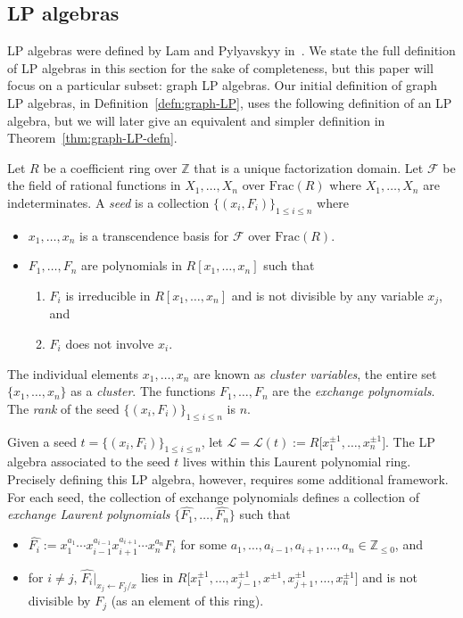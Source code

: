 \documentclass[pdftex]{sigma}
\numberwithin{equation}{section}
\newcommand{\Z}{\mathbb{Z}}
\begin{document}
\subsection{LP algebras}\label{sec:LP}
LP algebras were defined by Lam and Pylyavskyy in~\cite{LP-12}. We state the full definition of LP algebras in this section for the sake of completeness, but this paper will focus on a particular subset: graph LP algebras. Our initial definition of graph LP algebras, in Definition~\ref{defn:graph-LP}, uses the following definition of an LP algebra, but we will later give an equivalent and simpler definition in Theorem~\ref{thm:graph-LP-defn}.
\begin{Definition}[{cf.\ \cite[Section~2.1]{LP-12}}]
\label{defn:LP-alg}
Let $R$ be a coefficient ring over $\Z$ that is a unique factorization domain. Let $\mathcal{F}$ be the field of rational functions in $X_1,\dots,X_n$ over $\text{Frac}(R)$ where $X_1,\dots,X_n$ are indeterminates. A \emph{seed} is a collection $\{(x_i,F_i)\}_{1\leq i\leq n}$ where
\begin{itemize}\itemsep=0pt
 \item $x_1,\dots,x_n$ is a transcendence basis for $\mathcal{F}$ over $\text{Frac}(R)$.
 \item $F_1,\dots, F_n$ are polynomials in $R[x_1,\dots,x_n]$ such that
 \begin{enumerate}\itemsep=0pt
 \item[(LP1)] $F_i$ is irreducible in $R[x_1,\dots,x_n]$ and is not divisible by any variable $x_j$, and
 \item[(LP2)] $F_i$ does not involve $x_i$.
 \end{enumerate}
\end{itemize}
The individual elements $x_1, \dots, x_n$ are known as \emph{cluster variables}, the entire set $\{ x_1, \dots, x_n \}$ as a \emph{cluster}. The functions $F_1,\dots,F_n$ are the \emph{exchange polynomials}. The \emph{rank} of the seed $\{ (x_i, F_i) \}_{1 \leq i \leq n}$ is $n$.
\end{Definition}
Given a seed $t = \{(x_i,F_i)\}_{1\leq i\leq n}$, let $ \mathcal{L} = \mathcal{L}(t) := R\big[x_1^{\pm 1}, \dots, x_n^{\pm 1}\big]$. The LP algebra associated to the seed $t$ lives within this Laurent polynomial ring. Precisely defining this LP algebra, however, requires some additional framework.
For each seed, the collection of exchange polynomials defines a collection of \emph{exchange Laurent polynomials} $\{ \hat{F_1}, \dots, \hat{F_n} \}$ such that
\begin{itemize}\itemsep=0pt
 \item $\hat{F_i} := x_1^{a_1} \cdots x_{i-1}^{a_{i-1}}x_{i+1}^{a_{i+1}}\cdots x_n^{a_n}F_i$ for some $a_1, \dots, a_{i-1},a_{i+1},\dots,a_n \in \mathbb{Z}_{\leq 0}$, and
 \item for $i \neq j$, $\hat{F_i}\big|_{x_j \leftarrow F_j/x}$ lies in $R\big[x_1^{\pm 1}, \dots, x_{j-1}^{\pm 1},x^{\pm 1}, x_{j+1}^{\pm 1}, \dots, x_n^{\pm 1}\big]$ and is not divisible by $F_j$ (as an element of this ring).
\end{itemize}
\end{document}
